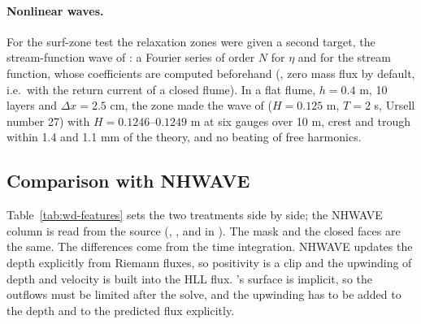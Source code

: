\paragraph{Nonlinear waves.} For the surf-zone test the relaxation zones were
given a second target, the stream-function wave of \citet{fenton1988}: a
Fourier series of order $N$ for $\eta$ and for the stream function, whose
coefficients are computed beforehand (,
zero mass flux by default, i.e.\ with the return current of a closed flume).
In a flat flume, $h = 0.4$ m, 10 layers and $\Delta x = 2.5$ cm, the zone made
the wave of \citet{ting1994} ($H = 0.125$ m, $T = 2$ s, Ursell number 27)
with $H = 0.1246$--$0.1249$ m at six gauges over 10 m, crest and trough
within 1.4 and 1.1 mm of the theory, and no beating of free harmonics.

\subsection{Comparison with NHWAVE}
\label{sec:wd-nhwave}

Table~\ref{tab:wd-features} sets the two treatments side by side; the NHWAVE
column is read from the source (, ,
 and  in ). The mask and the
closed faces are the same. The differences come from the time integration.
NHWAVE updates the depth explicitly from Riemann fluxes, so positivity is a
clip and the upwinding of depth and velocity is built into the HLL flux.
\NHFOAM's surface is implicit, so the outflows must be limited after the
solve, and the upwinding has to be added to the depth and to the predicted
flux explicitly.

